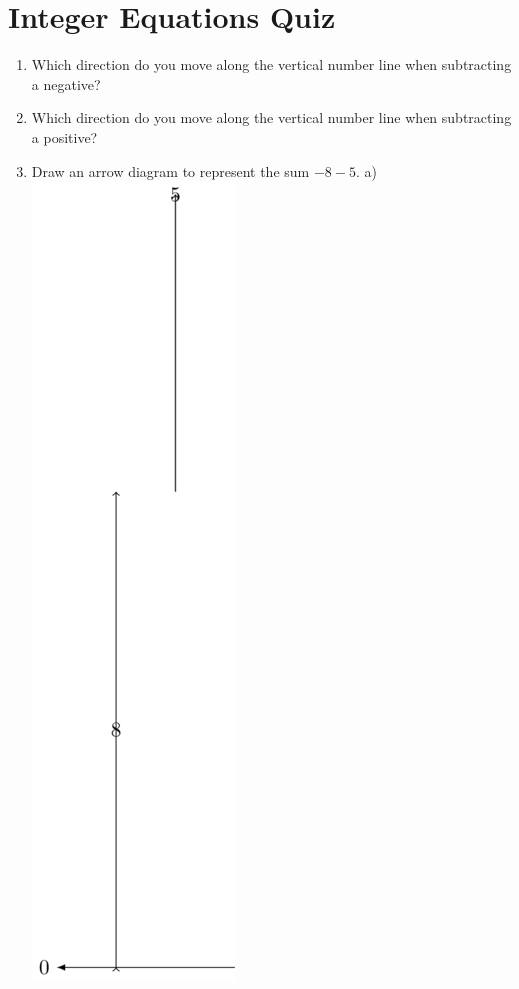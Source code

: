\documentclass[18pt]{article}%
\begin{document}
%
\normalsize%
\Large
\section{Integer Equations Quiz}%
\label{sec:IntegerEquationsQuiz}%

    \begin{center}
    \end{center}
    \vspace{0.1in}
\begin{multicols}{2}%
\begin{enumerate}[label=\arabic*),start=1]%
\item%
Which direction do you move along the vertical number line when subtracting a negative?%
\newline%
\newline%
%
\vspace{2cm}%
\item%
Which direction do you move along the vertical number line when subtracting a positive?%
\newline%
\newline%
%
\vspace{2cm}%
\item%
Draw an arrow diagram to represent the sum $-8-5$.%
\newline%
\newline%
%
a)%
\includegraphics[width=0.2\columnwidth]{ArrowDiagrams/ArrowDiagram-1-0a.png}%

\end{enumerate}
\end{multicols}
\end{document}
